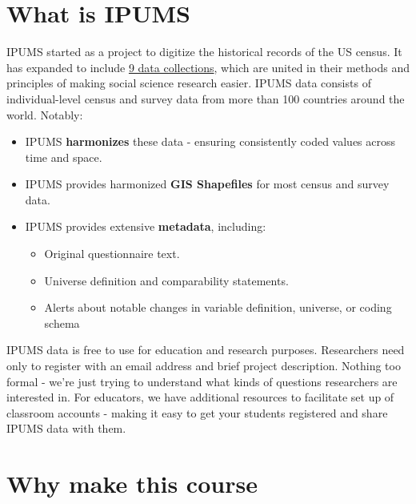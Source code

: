 \documentclass[
]{book}
\providecommand{\tightlist}{%
  \setlength{\itemsep}{0pt}\setlength{\parskip}{0pt}}
\begin{document}
\hypertarget{what-is-ipums}{%
\section*{What is IPUMS}\label{what-is-ipums}}

IPUMS started as a project to digitize the historical records of the US census.
It has expanded to include \href{https://www.ipums.org/}{9 data collections},
which are united in their methods and principles of making social science
research easier. IPUMS data consists of individual-level census and survey data
from more than 100 countries around the world. Notably:

\begin{itemize}
\tightlist
\item
  IPUMS \textbf{harmonizes} these data - ensuring consistently coded values across time and space.
\item
  IPUMS provides harmonized \textbf{GIS Shapefiles} for most census and survey data.
\item
  IPUMS provides extensive \textbf{metadata}, including:

  \begin{itemize}
  \tightlist
  \item
    Original questionnaire text.
  \item
    Universe definition and comparability statements.
  \item
    Alerts about notable changes in variable definition,
    universe, or coding schema
  \end{itemize}
\end{itemize}

IPUMS data is free to use for education and research purposes. Researchers need
only to register with an email address and brief project description. Nothing
too formal - we're just trying to understand what kinds of questions
researchers are interested in. For educators, we have additional resources
to facilitate set up of classroom accounts - making it easy to get your
students registered and share IPUMS data with them.

\hypertarget{why-make-this-course}{%
\section*{Why make this course}\label{why-make-this-course}}
\end{document}
